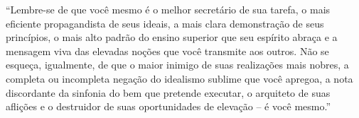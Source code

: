 ``Lembre-se de que você mesmo é o melhor secretário de sua tarefa, o mais eficiente propagandista de seus ideais, a mais clara demonstração de seus princípios, o mais alto padrão do ensino superior que seu espírito abraça e a mensagem viva das elevadas noções que você transmite aos outros. Não se esqueça, igualmente, de que o maior inimigo de suas realizações mais nobres, a completa ou incompleta negação do idealismo sublime que você apregoa, a nota discordante da sinfonia do bem que pretende executar, o arquiteto de suas aflições e o destruidor de suas oportunidades de elevação -- é você mesmo.''


